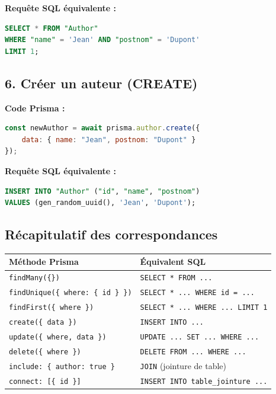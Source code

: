 \textbf{Requête SQL équivalente :}
\begin{lstlisting}[language=SQL]
SELECT * FROM "Author"
WHERE "name" = 'Jean' AND "postnom" = 'Dupont'
LIMIT 1;
\end{lstlisting}

\subsection*{6. Créer un auteur (CREATE)}

\textbf{Code Prisma :}
\begin{lstlisting}[language=JavaScript]
const newAuthor = await prisma.author.create({
    data: { name: "Jean", postnom: "Dupont" }
});
\end{lstlisting}

\textbf{Requête SQL équivalente :}
\begin{lstlisting}[language=SQL]
INSERT INTO "Author" ("id", "name", "postnom")
VALUES (gen_random_uuid(), 'Jean', 'Dupont');
\end{lstlisting}

\newpage
\subsection*{Récapitulatif des correspondances}

\begin{center}
\small
\begin{tabular}{ll}
\toprule
\textbf{Méthode Prisma} & \textbf{Équivalent SQL} \\
\midrule
\texttt{findMany(\{\})} & \texttt{SELECT * FROM ...} \\
\texttt{findUnique(\{ where: \{ id \} \})} & \texttt{SELECT * ... WHERE id = ...} \\
\texttt{findFirst(\{ where \})} & \texttt{SELECT * ... WHERE ... LIMIT 1} \\
\texttt{create(\{ data \})} & \texttt{INSERT INTO ...} \\
\texttt{update(\{ where, data \})} & \texttt{UPDATE ... SET ... WHERE ...} \\
\texttt{delete(\{ where \})} & \texttt{DELETE FROM ... WHERE ...} \\
\texttt{include: \{ author: true \}} & \texttt{JOIN} (jointure de table) \\
\texttt{connect: [\{ id \}]} & \texttt{INSERT INTO table\_jointure ...} \\
\bottomrule
\end{tabular}
\end{center}

